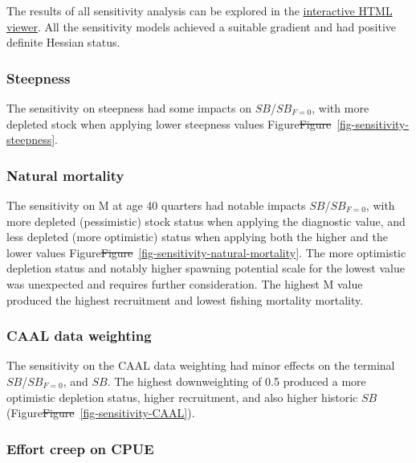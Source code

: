\documentclass[
  english,
  a4paper,
  a4paper,
  11pt]{SCreport}
\providecommand{\DIFdel}[1]{{\protect\color{red}\sout{#1}}}                      %
\providecommand{\DIFdelbegin}{} %
\providecommand{\DIFdelend}{} %
\newcommand{\DIFscaledelfig}{0.5}
\newlength{\DIFdelgraphicswidth} %
\newlength{\DIFdelgraphicsheight} %
\newcommand{\DIFdelincludegraphics}[2][]{%
\sbox{\DIFdelgraphicsbox}{\DIFOincludegraphics[#1]{#2}}%
\settoboxwidth{\DIFdelgraphicswidth}{\DIFdelgraphicsbox} %
\settoboxtotalheight{\DIFdelgraphicsheight}{\DIFdelgraphicsbox} %
\scalebox{\DIFscaledelfig}{%
\parbox[b]{\DIFdelgraphicswidth}{\usebox{\DIFdelgraphicsbox}\\[-\baselineskip] \rule{\DIFdelgraphicswidth}{0em}}\llap{\resizebox{\DIFdelgraphicswidth}{\DIFdelgraphicsheight}{%
\setlength{\unitlength}{\DIFdelgraphicswidth}%
\begin{picture}(1,1)%
\thicklines\linethickness{2pt} %
{\color[rgb]{1,0,0}\put(0,0){\framebox(1,1){}}}%
{\color[rgb]{1,0,0}\put(0,0){\line( 1,1){1}}}%
{\color[rgb]{1,0,0}\put(0,1){\line(1,-1){1}}}%
\end{picture}%
}\hspace*{3pt}}} %
} %
\DeclareRobustCommand{\DIFdelbegin}{\DIFOdelbegin \let\includegraphics\DIFdelincludegraphics} %
\DeclareRobustCommand{\DIFdelend}{\DIFOaddend \let\includegraphics\DIFOincludegraphics} %
\begin{document}
The results of all sensitivity analysis can be explored in the
\href{https://pacificcommunity.github.io/ofp-sam-bet-2026-sensitivity/bet-2026-sensitivity-interactive-viewer.html}{interactive
HTML viewer}. All the sensitivity models achieved a suitable gradient
and had positive definite Hessian status.

\subsubsection{Steepness}\label{sec-oneoff-steepness}

The sensitivity on steepness had some impacts on \(SB\)/\(SB_{F=0}\),
with more depleted stock when applying lower steepness values
Figure\DIFdelbegin \DIFdel{Figure}\DIFdelend ~\ref{fig-sensitivity-steepness}.

\subsubsection{Natural mortality}\label{sec-oneoff-natural-mortality}

The sensitivity on M at age 40 quarters had notable impacts
\(SB\)/\(SB_{F=0}\), with more depleted (pessimistic) stock status when
applying the diagnostic value, and less depleted (more optimistic)
status when applying both the higher and the lower values
Figure\DIFdelbegin \DIFdel{Figure}\DIFdelend ~\ref{fig-sensitivity-natural-mortality}. The more optimistic
depletion status and notably higher spawning potential scale for the
lowest value was unexpected and requires further consideration. The
highest M value produced the highest recruitment and lowest fishing
mortality mortality.

\subsubsection{CAAL data
weighting}\label{sec-oneoff-caal-data-weighting}

The sensitivity on the CAAL data weighting had minor effects on the
terminal \(SB\)/\(SB_{F=0}\), and \(SB\). The highest downweighting of
0.5 produced a more optimistic depletion status, higher recruitment, and
also higher historic \(SB\) (Figure\DIFdelbegin \DIFdel{Figure}\DIFdelend ~\ref{fig-sensitivity-CAAL}).

\subsubsection{Effort creep on CPUE}\label{sec-oneoff-effort-creep}
\end{document}
